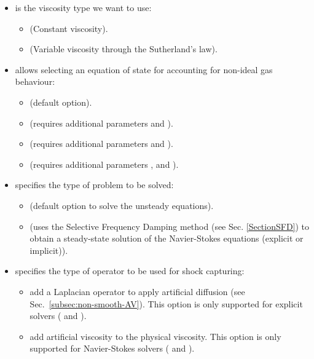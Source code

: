 \begin{itemize}
\begin{itemize}
    \end{itemize}
  \item {} is the viscosity type we want to use:
    \begin{itemize}
      \item {} (Constant viscosity).
      \item {} (Variable viscosity through the Sutherland's law).
    \end{itemize}
  \item {} allows selecting an equation of state for
    accounting for non-ideal gas behaviour:
    \begin{itemize}
        \item {} (default option).
        \item {} (requires additional parameters  and ).
        \item {} (requires additional parameters  and ).
        \item {} (requires additional parameters ,  and
          ).
      \end{itemize}
  \item {} specifies the type of problem to be solved:
    \begin{itemize}
      \item {} (default option to solve the unsteady equations).
      \item {} (uses the Selective Frequency Damping method
        (see Sec. \ref{SectionSFD}) to obtain a steady-state solution of the
        Navier-Stokes equations (explicit or implicit)).
    \end{itemize}
  \item {} specifies the type of operator to be used for shock capturing:
    \begin{itemize}
      \item {} add a Laplacian operator to apply artificial diffusion (see Sec.~\ref{subsec:non-smooth-AV}). 
        This option is only supported for explicit solvers ( and ).
      \item {} add artificial viscosity to the physical viscosity.
        This option is only supported for Navier-Stokes solvers ( and ).

\end{itemize}
\end{itemize}
